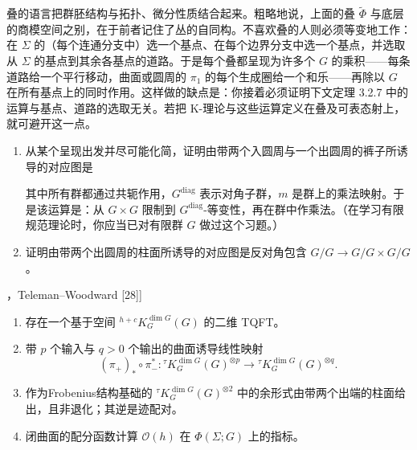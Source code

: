 叠的语言把群胚结构与拓扑、微分性质结合起来。粗略地说，上面的叠 $\tilde\Phi$ 与底层的商模空间之别，在于前者记住了丛的自同构。不喜欢叠的人则必须等变地工作：在 $\Sigma$ 的（每个连通分支中）选一个基点、在每个边界分支中选一个基点，并选取从 $\Sigma$ 的基点到其余各基点的道路。于是每个叠都呈现为许多个 $G$ 的乘积——每条道路给一个平行移动，曲面或圆周的 $\pi_1$ 的每个生成圈给一个和乐——再除以 $G$ 在所有基点上的同时作用。这样做的缺点是：你接着必须证明下文定理 3.2.7 中的运算与基点、道路的选取无关。若把 K-理论与这些运算定义在叠及可表态射上，就可避开这一点。

\begin{exercise}
\begin{enumerate}[label=(\roman*),leftmargin=2.6em,itemsep=2pt]
\item 从某个呈现出发并尽可能化简，证明由带两个入圆周与一个出圆周的裤子所诱导的对应图是
\begin{center}
\end{center}
其中所有群都通过共轭作用，$G^{\mathrm{diag}}$ 表示对角子群，$m$ 是群上的乘法映射。于是该运算是：从 $G\times G$ 限制到 $G^{\mathrm{diag}}$-等变性，再在群中作乘法。（在学习有限规范理论时，你应当已对有限群 $G$ 做过这个习题。）
\item 证明由带两个出圆周的柱面所诱导的对应图是反对角包含 $G/G\to G/G\times G/G$。
\end{enumerate}
\end{exercise}

\begin{theorem}[Freed--Hopkins--Teleman [13]，Teleman--Woodward [28]]
\begin{enumerate}[label=(\roman*),leftmargin=2.6em,itemsep=2pt]
\item 存在一个基于空间 ${}^{h+c}K^{\dim G}_G(G)$ 的二维 TQFT。
\item 带 $p$ 个输入与 $q>0$ 个输出的曲面诱导线性映射
\[
(\pi_+)_*\circ\pi_-^*\colon{}^\tau K^{\dim G}_G(G)^{\otimes p}\to{}^\tau K^{\dim G}_G(G)^{\otimes q}.
\]
\item 作为Frobenius结构基础的 ${}^\tau K^{\dim G}_G(G)^{\otimes2}$ 中的余形式由带两个出端的柱面给出，且非退化；其逆是迹配对。
\item 闭曲面的配分函数计算 $\mathcal{O}(h)$ 在 $\Phi(\Sigma;G)$ 上的指标。
\end{enumerate}
\end{theorem}

